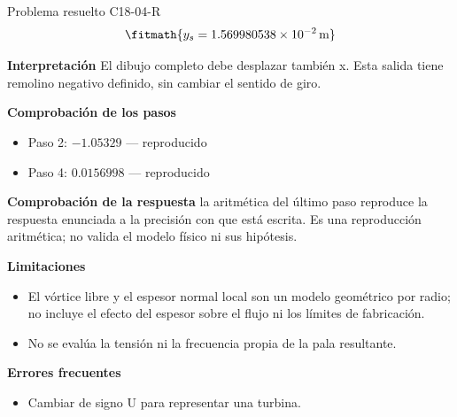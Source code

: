 \documentclass[10pt,openany]{book}
\begin{document}
\begin{studiumworked}{Problema resuelto C18-04-R}
\[
\fitmath{y_s=1.569980538\times10^{-2}\,\mathrm{m}}
\]

\noindent\textbf{Interpretación}
El dibujo completo debe desplazar también x. Esta salida tiene remolino negativo definido, sin cambiar el sentido de giro.

\noindent\textbf{Comprobación de los pasos}
\begin{itemize}
\item Paso 2: $-1.05329$ — reproducido
\item Paso 4: $0.0156998$ — reproducido
\end{itemize}

\noindent\textbf{Comprobación de la respuesta} la aritmética del último paso reproduce la respuesta enunciada a la precisión con que está escrita. Es una reproducción aritmética; no valida el modelo físico ni sus hipótesis.

\noindent\textbf{Limitaciones}
\begin{itemize}
\item El vórtice libre y el espesor normal local son un modelo geométrico por radio; no incluye el efecto del espesor sobre el flujo ni los límites de fabricación.
\item No se evalúa la tensión ni la frecuencia propia de la pala resultante.
\end{itemize}

\noindent\textbf{Errores frecuentes}
\begin{itemize}
\item Cambiar de signo U para representar una turbina.
\end{itemize}
\end{studiumworked}
\end{document}
